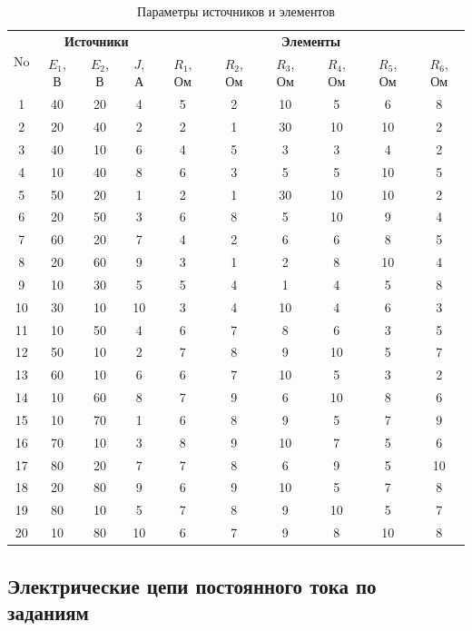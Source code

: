 \begin{table}[H]
\centering
\caption{Параметры источников и элементов}
\begin{tabular}{|c|c|c|c|c|c|c|c|c|c|}
\hline
\multirow{2}{*}{No} & \multicolumn{3}{c|}{\textbf{Источники}} & \multicolumn{6}{c|}{\textbf{Элементы}} \\
\cline{2-4}\cline{5-10}
& $E_1$, В & $E_2$, В & $J$, А & $R_1$, Ом & $R_2$, Ом & $R_3$, Ом & $R_4$, Ом & $R_5$, Ом & $R_6$, Ом \\
\hline
1 & 40 & 20 & 4 & 5 & 2 & 10 & 5 & 6 & 8 \\
2 & 20 & 40 & 2 & 2 & 1 & 30 & 10 & 10 & 2 \\
3 & 40 & 10 & 6 & 4 & 5 & 3 & 3 & 4 & 2 \\
4 & 10 & 40 & 8 & 6 & 3 & 5 & 5 & 10 & 5 \\
5 & 50 & 20 & 1 & 2 & 1 & 30 & 10 & 10 & 2 \\
\hline
6 & 20 & 50 & 3 & 6 & 8 & 5 & 10 & 9 & 4 \\
7 & 60 & 20 & 7 & 4 & 2 & 6 & 6 & 8 & 5 \\
8 & 20 & 60 & 9 & 3 & 1 & 2 & 8 & 10 & 4 \\
9 & 10 & 30 & 5 & 5 & 4 & 1 & 4 & 5 & 8 \\
10 & 30 & 10 & 10 & 3 & 4 & 10 & 4 & 6 & 3 \\
\hline
11 & 10 & 50 & 4 & 6 & 7 & 8 & 6 & 3 & 5 \\
12 & 50 & 10 & 2 & 7 & 8 & 9 & 10 & 5 & 7 \\
13 & 60 & 10 & 6 & 6 & 7 & 10 & 5 & 3 & 2 \\
14 & 10 & 60 & 8 & 7 & 9 & 6 & 10 & 8 & 6 \\
15 & 10 & 70 & 1 & 6 & 8 & 9 & 5 & 7 & 9 \\
\hline
16 & 70 & 10 & 3 & 8 & 9 & 10 & 7 & 5 & 6 \\
17 & 80 & 20 & 7 & 7 & 8 & 6 & 9 & 5 & 10 \\
18 & 20 & 80 & 9 & 6 & 9 & 10 & 5 & 7 & 8 \\
19 & 80 & 10 & 5 & 7 & 8 & 9 & 10 & 5 & 7 \\
20 & 10 & 80 & 10 & 6 & 7 & 9 & 8 & 10 & 8 \\
\hline
\end{tabular}
\label{tab:parameters}
\end{table}

\subsection{Электрические цепи постоянного тока по заданиям}

